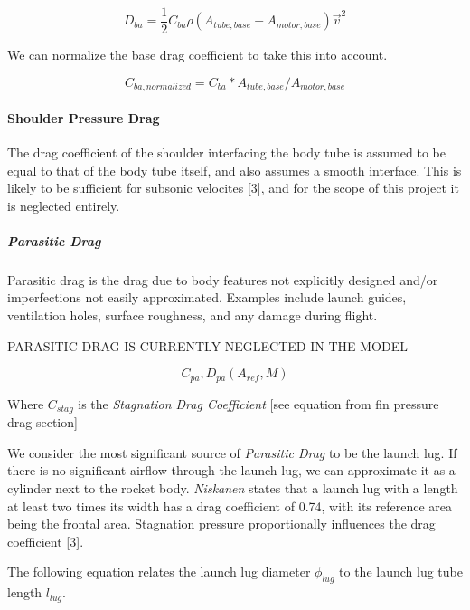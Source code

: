 \documentclass[]{article}
\let\oldparagraph\paragraph
\renewcommand{\paragraph}[1]{\oldparagraph{#1}\mbox{}}
\let\oldsubparagraph\subparagraph
\renewcommand{\subparagraph}[1]{\oldsubparagraph{#1}\mbox{}}
\begin{document}
\begin{equation}
\label{eq_base_drag_force}
D_{ba} = \dfrac{1}{2} C_{ba} \rho (A_{tube,base} - A_{motor,base}) \vec{v}^2 
\end{equation}

We can normalize the base drag coefficient to take this into account.

\begin{equation}
\label{eq_base_drag_coefficient_normalized}
C_{ba,normalized} =
C_{ba} * A_{tube,base}/A_{motor,base}
\end{equation}

\paragraph{Shoulder Pressure Drag}\label{shoulder-pressure-drag}

The drag coefficient of the shoulder interfacing the body tube is
assumed to be equal to that of the body tube itself, and also assumes a
smooth interface. This is likely to be sufficient for subsonic velocites
{[}3{]}, and for the scope of this project it is neglected entirely.

\subparagraph{Parasitic Drag}\label{parasitic-drag}

Parasitic drag is the drag due to body features not explicitly designed
and/or imperfections not easily approximated. Examples include launch
guides, ventilation holes, surface roughness, and any damage during
flight.

PARASITIC DRAG IS CURRENTLY NEGLECTED IN THE MODEL

\begin{equation}
C_{pa}, D_{pa} (A_{ref}, M) 
\end{equation}

Where \(C_{stag}\) is the \emph{Stagnation Drag Coefficient} {[}see
equation from fin pressure drag section{]}

We consider the most significant source of \emph{Parasitic Drag} to be
the launch lug. If there is no significant airflow through the launch
lug, we can approximate it as a cylinder next to the rocket body.
\emph{Niskanen} states that a launch lug with a length at least two
times its width has a drag coefficient of 0.74, with its reference area
being the frontal area. Stagnation pressure proportionally influences
the drag coefficient {[}3{]}.

The following equation relates the launch lug diameter \(\phi_{lug}\) to
the launch lug tube length \(l_{lug}\).
\end{document}
